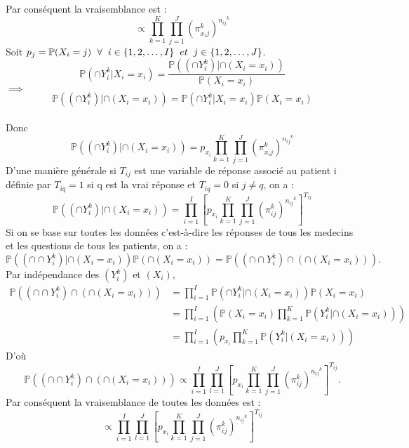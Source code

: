\documentclass[a4paper,french,10pt]{article}
\begin{document}
	Par conséquent la vraisemblance est : \[\propto \prod_{k=1}^{K} \prod_{j=1}^{J} \left(\pi_{x_ij}^k\right)^{{n_{ij}}^{k}}\]
	Soit $p_j = \mathbb{P}(X_i = j) \hspace{2mm}\forall\hspace{2mm}i \in \{1, 2, \dots,I\}\hspace{2mm} et\hspace{2mm} j \in \{1, 2, \dots,J\}$.
	\[\mathbb{P} (\cap Y_{i}^k | X_i=x_i ) = \frac{\mathbb{P} \left((\cap Y_{i}^k) | \cap(X_i=x_i) \right)}{\mathbb{P}(X_i = x_i)}\] $\implies$ \[\mathbb{P} \left((\cap Y_{i}^k) | \cap(X_i=x_i) \right) = \mathbb{P} (\cap Y_{i}^k | X_i=x_i ) \mathbb{P}(X_i = x_i)\]\\
	Donc \[\mathbb{P} \left((\cap Y_{i}^k) | \cap(X_i=x_i) \right) = p_{x_{i}} \prod_{k=1}^{K} \prod_{j=1}^{J} \left(\pi_{x_ij}^k\right)^{{n_{ij}}^{k}}\]
	D'une manière générale si $T_{ij}$ est une variable de réponse associé au patient i définie par $T_{iq} = 1$  si q est la vrai réponse et $T_{iq} = 0$ si $j \neq q$, on a :
	\[\mathbb{P} \left((\cap Y_{i}^k) | \cap(X_i=x_i) \right) = \prod_{i=1}^{I}\left[p_{x_i} \prod_{k=1}^{K} \prod_{j=1}^{J} \left(\pi_{ij}^k\right)^{{n_{ij}}^{k}}\right]^{T_{ij}}\]
	Si on se base sur toutes les données c'est-à-dire les réponses de tous les medecins et les questions de tous les patients, on a :
	\[\mathbb{P} \left((\cap \cap Y_{i}^k) | \cap(X_i=x_i) \right) \mathbb{P}\left(\cap (X_i = x_i)\right) = \mathbb{P} \left((\cap \cap Y_{i}^k) \cap \left(\cap(X_i=x_i)\right)  \right).\]
	Par indépendance des $(Y_{i}^k)$ et $(X_i)$, 
	\begin{align*}
		\mathbb{P} \left((\cap \cap Y_{i}^k) \cap \left(\cap(X_i=x_i)\right)  \right) &= \prod_{i=1}^{I} \mathbb{P} \left(\cap Y_{i}^k | \cap (X_i=x_i)\right) \mathbb{P}(X_i = x_i)\\
		&= \prod_{i=1}^{I}\left(\mathbb{P}(X_i = x_i) \prod_{k=1}^{K}\mathbb{P} \left( Y_{i}^k | \cap(X_i=x_i) \right)\right) \\
		&= \prod_{i=1}^{I}\left(p_{x_i} \prod_{k=1}^{K}\mathbb{P} \left( Y_{i}^k | (X_i=x_i) \right)\right)
	\end{align*}
	D'où \[\mathbb{P} \left((\cap \cap Y_{i}^k) \cap \left(\cap(X_i=x_i)\right)  \right) \propto \prod_{i=1}^{I}\prod_{l=1}^{J}\left[p_{x_i} \prod_{k=1}^{K} \prod_{j=1}^{J} \left(\pi_{ij}^k\right)^{{n_{ij}}^{k}}\right]^{T_{ij}}.\]
	Par conséquent la vraisemblance de toutes les données est :
	\[\propto \prod_{i=1}^{I}\prod_{l=1}^{J}\left[p_{x_i} \prod_{k=1}^{K} \prod_{j=1}^{J} \left(\pi_{ij}^k\right)^{{n_{ij}}^{k}}\right]^{T_{ij}}\]
	
\end{document}
